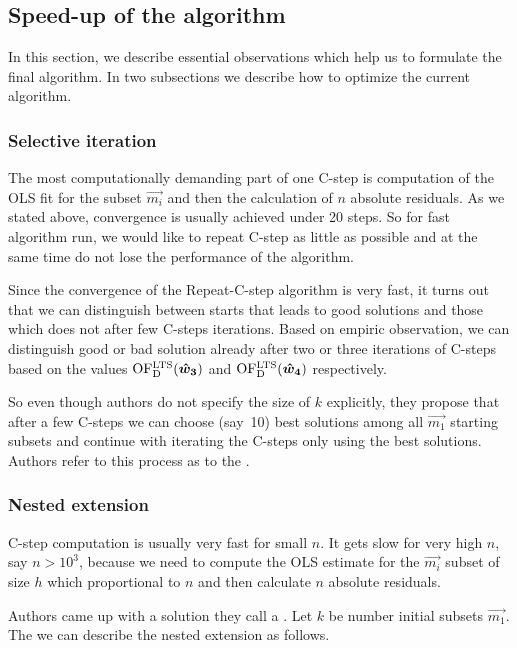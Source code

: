 
\subsection{Speed-up of the algorithm}
In this section, we describe essential observations which help us to formulate the final algorithm. In two subsections we describe how to optimize the current algorithm. 

\subsubsection*{Selective iteration}
The most computationally demanding part of one C-step is computation of the OLS fit for the subset $\vec{m_i}$ and then the calculation of $n$ absolute residuals. As we stated above, convergence is usually achieved under 20 steps. So for fast algorithm run, we would like to repeat C-step as little as possible and at the same time do not lose the performance of the algorithm. 

Since the convergence of the Repeat-C-step algorithm is very fast, it turns out that we can distinguish between starts that leads to good solutions and those which does not after few C-steps iterations. Based on empiric observation, we can distinguish good or bad solution already after two or three iterations of C-steps based on the values $\operatorname{OF^{LTS}_D}(\boldsymbol{\hat{w}_3})$ and $\operatorname{OF^{LTS}_D}(\boldsymbol{\hat{w}_4})$ respectively. 

So even though authors do not specify the size of $k$ explicitly, they propose that after a few C-steps we can choose (say~10) best solutions among all $\vec{m_1}$ starting subsets and continue with iterating the C-steps only using the best solutions.
Authors refer to this process as to the .

\subsubsection*{Nested extension}
C-step computation is usually very fast for small $n$. It gets slow for very high $n$, say $n > 10^3$, because we need to compute the OLS estimate for the $\vec{m_i}$ subset of size $h$ which proportional to $n$ and then calculate $n$ absolute residuals.

Authors came up with a solution they call a . Let $k$ be number initial subsets $\vec{m_1}$. The we can describe the nested extension as follows.

